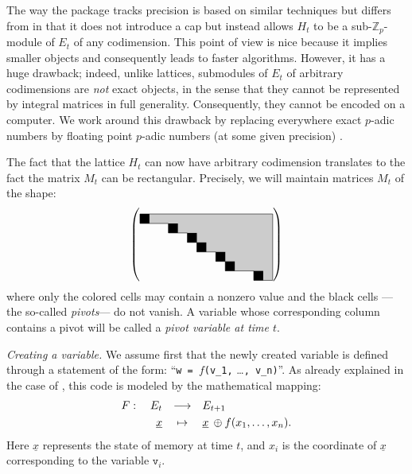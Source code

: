 \documentclass[sigconf]{acmart}
\newcommand{\Z}{\mathbb Z}
\newcommand{\Zp}{\Z_p}
\newcommand{\ttv}{\texttt{v}\xspace}
\newcommand{\ZpLC}{\text{\color{output} \rm \tt ZpLC}\xspace}
\newcommand{\ZpLF}{\text{\color{output} \rm \tt ZpLF}\xspace}
\theoremstyle{definition}
\begin{document}
The way the package \ZpLF tracks precision is based on similar 
techniques but differs from \ZpLC in that it does not introduce a cap 
but instead allows $H_t$ to be a sub-$\Zp$-module of $E_t$ of any 
codimension.
This point of view is nice because it implies smaller objects and 
consequently leads to faster algorithms. However, it has a huge 
drawback; indeed, unlike lattices, submodules of $E_t$ of arbitrary 
codimensions are \emph{not} exact objects, in the sense that they cannot 
be represented by integral matrices in full generality. Consequently,
they cannot be encoded on a computer.
We work around this drawback by replacing everywhere exact $p$-adic 
numbers by floating point $p$-adic numbers (at some given precision) 
\cite{course-padic}.

The fact that the lattice $H_t$ can now have arbitrary codimension
translates to the fact the matrix $M_t$ can be rectangular.
Precisely, we will maintain matrices $M_t$ of the shape:
\begin{equation}
\label{eq:shapeM-ZpLF}
\left(\raisebox{-0.5\height}{\begin{tikzpicture}[scale=0.3]
\fill[black!20] (0,0)--(0,-1)--(3,-1)--(3,-2)--(5,-2)--(5,-3)
    --(6,-3)--(6,-4)--(8,-4)--(8,-5)--(9,-5)--(9,-6)--(12,-6)
    --(12,-7)--(14,-7)--(14,0)--cycle;
\draw (0,0)--(0,-1)--(3,-1)--(3,-2)--(5,-2)--(5,-3)
    --(6,-3)--(6,-4)--(8,-4)--(8,-5)--(9,-5)--(9,-6)--(12,-6)
    --(12,-7)--(14,-7);
\fill (0,0) rectangle (1,-1);
\fill (3,-1) rectangle (4,-2);
\fill (5,-2) rectangle (6,-3);
\fill (6,-3) rectangle (7,-4);
\fill (8,-4) rectangle (9,-5);
\fill (9,-5) rectangle (10,-6);
\fill (12,-6) rectangle (13,-7);
\draw[thin] (14,-7)--(14,0)--(0,0);
\end{tikzpicture}}\right)
\end{equation}
where only the colored cells may contain a nonzero value and the 
black cells ---the so-called \emph{pivots}--- do not vanish. A
variable whose corresponding column contains a pivot will be called 
a \emph{pivot variable at time $t$}.


\medskip

\noindent \textit{Creating a variable.}
%
We assume first that the newly created variable is defined through a
statement of the form:
``\verb?w = ?$f$\verb?(v_1,? \ldots\verb?, v_n)?''.
As already explained in the case of \ZpLC, this code is 
modeled by the mathematical mapping:
$$\begin{array}{rcl}
F: \quad E_t & \longrightarrow & E_{t+1} \smallskip \\
\underline x & \mapsto & \underline x \:\oplus f(x_1, \ldots, x_n).
\end{array}$$
Here $\underline x$ represents the state of memory at time $t$, 
and $x_i$ is the coordinate of $\underline x$ corresponding to the
variable $\ttv_i$.
\end{document}
